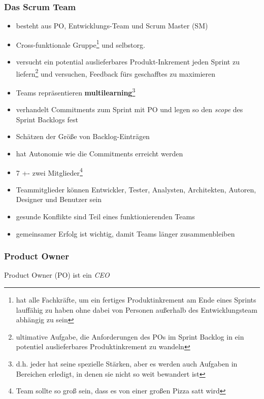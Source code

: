 \subsubsection{Das Scrum Team}
\begin{itemize}
  \item besteht aus PO, Entwicklungs-Team und Scrum Master (SM)
  \item Cross-funktionale Gruppe\footnote{hat alle Fachkräfte, um ein fertiges Produktinkrement am
      Ende eines Sprints lauffähig zu haben ohne dabei von Personen außerhalb des
      Entwicklungsteam abhängig zu sein} und selbstorg.
  \item versucht ein potential auslieferbares Produkt-Inkrement jeden Sprint zu
    liefern\footnote{ultimative Aufgabe, die Anforderungen des POs im Sprint Backlog in ein potentiel
    auslieferbares Produktinkrement zu wandeln} und versuchen, Feedback fürs geschafftes zu maximieren
  \item Teams repräsentieren \textbf{multilearning}\footnote{d.h. jeder hat seine spezielle Stärken, aber es werden
    auch Aufgaben in Bereichen erledigt, in denen sie nicht so weit bewandert ist}
  \item verhandelt Commitments zum Sprint mit PO und legen so den \textit{scope} des Sprint Backlogs fest
  \item Schätzen der Größe von Backlog-Einträgen
  \item hat Autonomie wie die Commitments erreicht werden
  \item 7 +- zwei Mitglieder\footnote{Team sollte so groß sein, dass es von einer großen Pizza satt
      wird}
  \item Teammitglieder können Entwickler, Tester, Analysten, Architekten, Autoren, Designer und Benutzer sein
  \item gesunde Konflikte sind Teil eines funktionierenden Teams
  \item gemeinsamer Erfolg ist wichtig, damit Teams länger zusammenbleiben
\end{itemize}


\subsubsection{Product Owner}
 Product Owner (PO) ist ein \textit{CEO}

